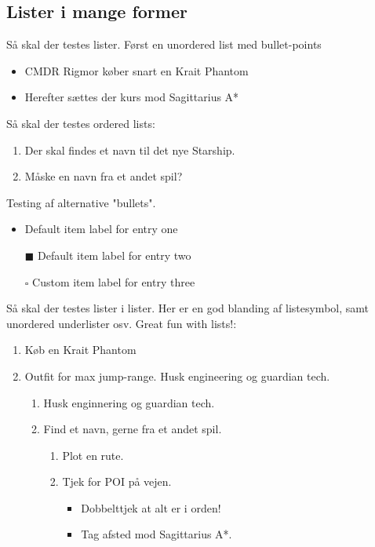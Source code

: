 \subsection{Lister i mange former}
Så skal der testes lister. Først en unordered list med bullet-points
\begin{itemize}
  \item CMDR Rigmor køber snart en Krait Phantom
  \item Herefter sættes der kurs mod Sagittarius A*
\end{itemize}

\vspace{1cm}
Så skal der testes ordered lists: 
\begin{enumerate}
  \item Der skal findes et navn til det nye Starship.
  \item Måske en navn fra et andet spil?
\end{enumerate}


\vspace{1cm}
Testing af alternative "bullets".
\begin{itemize}
 \item  Default item label for entry one
 \item[$\blacksquare$]  Default item label for entry two
 \item[$\square$]  Custom item label for entry three
\end{itemize}


\vspace{1cm}
Så skal der testes lister i lister. Her er en god blanding af listesymbol, samt unordered underlister osv. Great fun with lists!: 
 \renewcommand{\labelenumii}{\Roman{enumii}}
 \begin{enumerate}
   \item Køb en Krait Phantom
   \item Outfit for max jump-range. Husk engineering og guardian tech.
   \begin{enumerate}
     \item Husk enginnering og guardian tech.
     \item Find et navn, gerne fra et andet spil.
     \begin{enumerate}
       \item Plot en rute.
       \item Tjek for POI på vejen.
       \begin{itemize}
         \item Dobbelttjek at alt er i orden!
         \item Tag afsted mod Sagittarius A*.
       \end{itemize}
     \end{enumerate}
 \end{enumerate}
 \end{enumerate}

